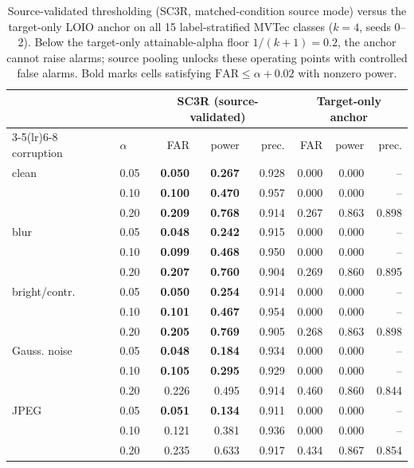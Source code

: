 \begin{table}[t]
\centering
\caption{Source-validated thresholding (SC3R, matched-condition source mode) versus the target-only LOIO anchor on all 15 label-stratified MVTec classes ($k{=}4$, seeds 0--2). Below the target-only attainable-alpha floor $1/(k{+}1){=}0.2$, the anchor cannot raise alarms; source pooling unlocks these operating points with controlled false alarms. Bold marks cells satisfying $\mathrm{FAR}\le\alpha{+}0.02$ with nonzero power.}
\label{tab:sc3r-source-validated}
\footnotesize
\setlength{\tabcolsep}{3pt}
\begin{tabular}{llrrrrrr}
\toprule
 & & \multicolumn{3}{c}{SC3R (source-validated)} & \multicolumn{3}{c}{Target-only anchor} \\
\cmidrule(lr){3-5}\cmidrule(lr){6-8}
corruption & $\alpha$ & FAR & power & prec. & FAR & power & prec. \\
\midrule
clean & 0.05 & \textbf{0.050} & \textbf{0.267} & 0.928 & 0.000 & 0.000 & -- \\
 & 0.10 & \textbf{0.100} & \textbf{0.470} & 0.957 & 0.000 & 0.000 & -- \\
 & 0.20 & \textbf{0.209} & \textbf{0.768} & 0.914 & 0.267 & 0.863 & 0.898 \\
\addlinespace[2pt]
blur & 0.05 & \textbf{0.048} & \textbf{0.242} & 0.915 & 0.000 & 0.000 & -- \\
 & 0.10 & \textbf{0.099} & \textbf{0.468} & 0.950 & 0.000 & 0.000 & -- \\
 & 0.20 & \textbf{0.207} & \textbf{0.760} & 0.904 & 0.269 & 0.860 & 0.895 \\
\addlinespace[2pt]
bright/contr. & 0.05 & \textbf{0.050} & \textbf{0.254} & 0.914 & 0.000 & 0.000 & -- \\
 & 0.10 & \textbf{0.101} & \textbf{0.467} & 0.954 & 0.000 & 0.000 & -- \\
 & 0.20 & \textbf{0.205} & \textbf{0.769} & 0.905 & 0.268 & 0.863 & 0.898 \\
\addlinespace[2pt]
Gauss. noise & 0.05 & \textbf{0.048} & \textbf{0.184} & 0.934 & 0.000 & 0.000 & -- \\
 & 0.10 & \textbf{0.105} & \textbf{0.295} & 0.929 & 0.000 & 0.000 & -- \\
 & 0.20 & 0.226 & 0.495 & 0.914 & 0.460 & 0.860 & 0.844 \\
\addlinespace[2pt]
JPEG & 0.05 & \textbf{0.051} & \textbf{0.134} & 0.911 & 0.000 & 0.000 & -- \\
 & 0.10 & 0.121 & 0.381 & 0.936 & 0.000 & 0.000 & -- \\
 & 0.20 & 0.235 & 0.633 & 0.917 & 0.434 & 0.867 & 0.854 \\
\bottomrule
\end{tabular}
\end{table}

